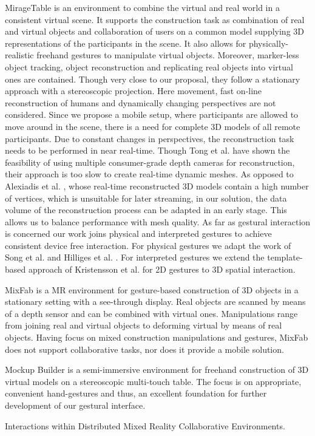 MirageTable \cite{Benko:2012:MFI:2207676.2207704} is an environment to combine the virtual and real world in a consistent virtual scene. It supports the construction task as combination of real and virtual objects and collaboration of users on a common model supplying 3D representations of the participants in the scene. It also allows for physically-realistic freehand gestures to manipulate virtual objects. Moreover, marker-less object tracking, object reconstruction and replicating real objects into virtual ones are contained. Though very close to our proposal, they follow a stationary approach with a stereoscopic projection. Here movement, fast on-line reconstruction of humans and dynamically changing perspectives are not considered. Since we propose a mobile setup, where participants are allowed to move around in the scene, there is a need for complete 3D models of all remote participants. Due to constant changes in perspectives, the reconstruction task needs to be performed in near real-time. Though Tong et  al. \cite{tong2012scanning} have shown the feasibility of using multiple consumer-grade depth cameras for reconstruction, their approach is too slow to create real-time dynamic meshes. As opposed to Alexiadis et al. \cite{alexiadis2013real}, whose real-time reconstructed 3D models contain a high number of vertices, which is unsuitable for later streaming, in our solution, the data volume of the reconstruction process can be adapted in an early stage. This allows us to balance performance with mesh quality. As far as gestural interaction is concerned our work joins physical and interpreted gestures to achieve consistent device free interaction. For physical gestures we adapt the work of Song et al. \cite{song2008vision} and Hilliges et al. \cite{hilliges2012holodesk}. For interpreted gestures we extend the template-based approach of Kristensson et al. \cite{Kristensson:2012:CRO:2166966.2166983} for 2D gestures to 3D spatial interaction. 

MixFab \cite{Weichel:2014:MME:2611222.2557090} is a MR environment for gesture-based construction of 3D objects in a stationary setting with a see-through display. Real objects are scanned by means of a depth sensor and can be combined with virtual ones. Manipulations range from joining real and virtual objects to deforming virtual by means of real objects. Having focus on mixed construction manipulations and gestures, MixFab does not support collaborative tasks, nor does it provide a mobile solution. 

Mockup Builder \cite{DeArauJo:2013:SST:2464168.2464286} is a semi-immersive environment for freehand construction of 3D virtual models on a stereoscopic multi-touch table. The focus is on appropriate, convenient hand-gestures and thus, an excellent foundation for further development of our gestural interface.

Interactions within Distributed Mixed Reality Collaborative Environments. \cite{pena-rios2014}